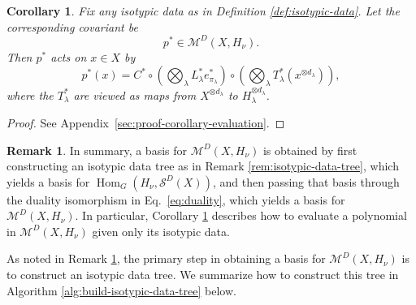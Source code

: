 \documentclass[11pt]{article}
\newcommand{\scM}{\mathcal{M}}
\newcommand{\scS}{\mathcal{S}}
\newcommand{\HomG}[2]{\operatorname{Hom}_G\!\left(#1,#2\right)}
\newtheorem{corollary}[theorem]{Corollary}
\theoremstyle{definition}
\newtheorem{remark}[theorem]{Remark}
\begin{document}
\begin{corollary}\label{cor:evaluation}
  Fix any isotypic data as in Definition \ref{def:isotypic-data}. Let the corresponding covariant be
  \[
    p^* \in \scM^D(X,H_\nu).
  \]
  Then $p^*$ acts on $x \in X$ by
  \begin{equation}
    p^*(x)
    =
    C^*
    \circ
    \left(\bigotimes_\lambda L_\lambda^*e^*_{\pi_\lambda}\right)
    \circ
    \left(\bigotimes_\lambda T_\lambda^*(x^{\otimes d_\lambda})\right),
  \end{equation}
  where the $T_\lambda^*$ are viewed as maps from $X^{\otimes d_\lambda}$ to $H_\lambda^{\otimes d_\lambda}$.
\end{corollary}
\begin{proof}
  See Appendix~\ref{sec:proof-corollary-evaluation}.
\end{proof}

\begin{remark}\label{rem:isotypic-data-tree-duality}
  In summary, a basis for $\scM^D(X,H_\nu)$ is obtained by first constructing an isotypic data tree as in Remark \ref{rem:isotypic-data-tree}, which yields a basis for $\HomG{H_\nu}{\scS^D(X)}$, and then passing that basis through the duality isomorphism in Eq.~\eqref{eq:duality}, which yields a basis for $\scM^D(X,H_\nu)$. In particular, Corollary \ref{cor:evaluation} describes how to evaluate a polynomial in $\scM^D(X,H_\nu)$ given only its isotypic data.
\end{remark}



As noted in Remark \ref{rem:isotypic-data-tree-duality}, the primary step in obtaining a basis for $\scM^D(X,H_\nu)$ is to construct an isotypic data tree. We summarize how to construct this tree in Algorithm \ref{alg:build-isotypic-data-tree} below.
\end{document}

